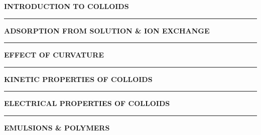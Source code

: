 \documentclass[8pt]{extarticle}
\begin{document}
\vspace{0.5cm}
{\centering \textbf{\LARGE INTRODUCTION TO COLLOIDS} \par}

\hrule

\vspace{0.5cm}
{\centering \textbf{\LARGE ADSORPTION FROM SOLUTION \& ION EXCHANGE} \par}

\hrule

\vspace{0.5cm}
{\centering \textbf{\LARGE EFFECT OF CURVATURE} \par}

\hrule

\vspace{0.5cm}
{\centering \textbf{\LARGE KINETIC PROPERTIES OF COLLOIDS} \par}

\hrule

\vspace{0.5cm}
{\centering \textbf{\LARGE ELECTRICAL PROPERTIES OF COLLOIDS} \par}

\hrule

\vspace{0.5cm}
{\centering \textbf{\LARGE EMULSIONS \& POLYMERS} \par}

\end{document}

